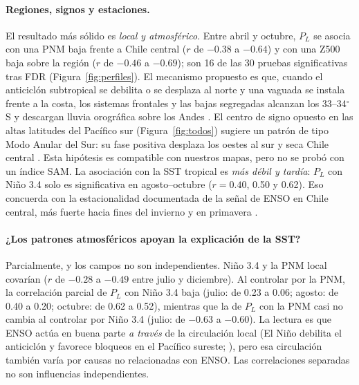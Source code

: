 \documentclass[11pt,letterpaper]{article}
\begin{document}
\paragraph{Regiones, signos y estaciones.} El resultado más sólido es \emph{local y atmosférico}. Entre abril y
octubre, $P_L$ se asocia con una PNM baja frente a Chile central ($r$ de $-0.38$ a $-0.64$) y con una Z500 baja
sobre la región ($r$ de $-0.46$ a $-0.69$); son 16 de las 30 pruebas significativas tras FDR
(Figura~\ref{fig:perfiles}). El mecanismo propuesto es que, cuando el anticiclón subtropical se debilita o se
desplaza al norte y una vaguada se instala frente a la costa, los sistemas frontales y las bajas segregadas
alcanzan los 33--34$^\circ$S y descargan lluvia orográfica sobre los Andes \citep{Garreaud2009}. El centro de
signo opuesto en las altas latitudes del Pacífico sur (Figura~\ref{fig:todos}) sugiere un patrón de tipo Modo
Anular del Sur: su fase positiva desplaza los oestes al sur y seca Chile central \citep{Gillett2006}. Esta
hipótesis es compatible con nuestros mapas, pero no se probó con un índice SAM. La asociación con la SST
tropical es \emph{más débil y tardía}: $P_L$ con Niño 3.4 solo es significativa en agosto--octubre ($r=0.40$,
0.50 y 0.62). Eso concuerda con la estacionalidad documentada de la señal de ENSO en Chile central, más fuerte
hacia fines del invierno y en primavera \citep{Montecinos2003}.

\paragraph{¿Los patrones atmosféricos apoyan la explicación de la SST?} Parcialmente, y los campos no son
independientes. Niño 3.4 y la PNM local covarían ($r$ de $-0.28$ a $-0.49$ entre julio y diciembre). Al
controlar por la PNM, la correlación parcial de $P_L$ con Niño 3.4 baja (julio: de 0.23 a 0.06; agosto: de 0.40
a 0.20; octubre: de 0.62 a 0.52), mientras que la de $P_L$ con la PNM casi no cambia al controlar por Niño 3.4
(julio: de $-0.63$ a $-0.60$). La lectura es que ENSO actúa en buena parte \emph{a través} de la circulación
local (El Niño debilita el anticiclón y favorece bloqueos en el Pacífico sureste;
\citealp{Rutllant1991,Montecinos2003}), pero esa circulación también varía por causas no relacionadas con ENSO.
Las correlaciones separadas no son influencias independientes.
\end{document}
